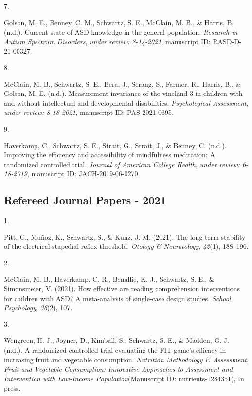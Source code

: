 \documentclass[11pt,a4paper,]{moderncv}
\newlength{\csllabelwidth}
\newcommand{\CSLLeftMargin}[1]{\parbox[t]{\csllabelwidth}{#1}}
\newcommand{\CSLRightInline}[1]{\parbox[t]{\linewidth - \csllabelwidth}{#1}}
\begin{document}
\leavevmode\hypertarget{ref-golson2021current}{}%
\CSLLeftMargin{7. }
\CSLRightInline{Golson, M. E., Benney, C. M., Schwartz, S. E., McClain,
M. B., \& Harris, B. (n.d.). Current state of ASD knowledge in the
general population. \emph{Research in Autism Spectrum Disorders},
\emph{under review: 8-14-2021}, manuscript ID: RASD-D-21-00327.}

\leavevmode\hypertarget{ref-McClain2021vineland}{}%
\CSLLeftMargin{8. }
\CSLRightInline{McClain, M. B., Schwartz, S. E., Bera, J., Serang, S.,
Farmer, R., Harris, B., \& Golson, M. E. (n.d.). Measurement invariance
of the vineland-3 in children with and without intellectual and
developmental disabilities. \emph{Psychological Assessment}, \emph{under
review: 8-18-2021}, manuscript ID: PAS-2021-0395.}

\leavevmode\hypertarget{ref-haverkamp2021mindfull}{}%
\CSLLeftMargin{9. }
\CSLRightInline{Haverkamp, C., Schwartz, S. E., Strait, G., Strait, J.,
\& Benney, C. (n.d.). Improving the efficiency and accessibility of
mindfulness meditation: A randomized controlled trial. \emph{Journal of
American College Health}, \emph{under review: 6-18-2019}, manuscript ID:
JACH-2019-06-0270.}

\vspace{7mm}

\hypertarget{refereed-journal-papers---2021}{%
\subsection{\texorpdfstring{\textbf{Refereed Journal Papers -
2021}}{Refereed Journal Papers - 2021}}\label{refereed-journal-papers---2021}}

\hypertarget{refs_journals2021}{}
\leavevmode\hypertarget{ref-pitt2021long}{}%
\CSLLeftMargin{1. }
\CSLRightInline{Pitt, C., Muñoz, K., Schwartz, S., \& Kunz, J. M.
(2021). The long-term stability of the electrical stapedial reflex
threshold. \emph{Otology \& Neurotology}, \emph{42}(1), 188--196.}

\leavevmode\hypertarget{ref-mcclain2021effective}{}%
\CSLLeftMargin{2. }
\CSLRightInline{McClain, M. B., Haverkamp, C. R., Benallie, K. J.,
Schwartz, S. E., \& Simonsmeier, V. (2021). How effective are reading
comprehension interventions for children with ASD? A meta-analysis of
single-case design studies. \emph{School Psychology}, \emph{36}(2),
107.}

\leavevmode\hypertarget{ref-Wengreen2021fit}{}%
\CSLLeftMargin{3. }
\CSLRightInline{Wengreen, H. J., Joyner, D., Kimball, S., Schwartz, S.
E., \& Madden, G. J. (n.d.). A randomized controlled trial evaluating
the FIT game's efficacy in increasing fruit and vegetable consumption.
\emph{Nutrition Methodology \& Assessment}, \emph{Fruit and Vegetable
Consumption: Innovative Approaches to Assessment and Intervention with
Low-Income Population}(Manuscript ID: nutrients-1284351), In press.}
\end{document}
